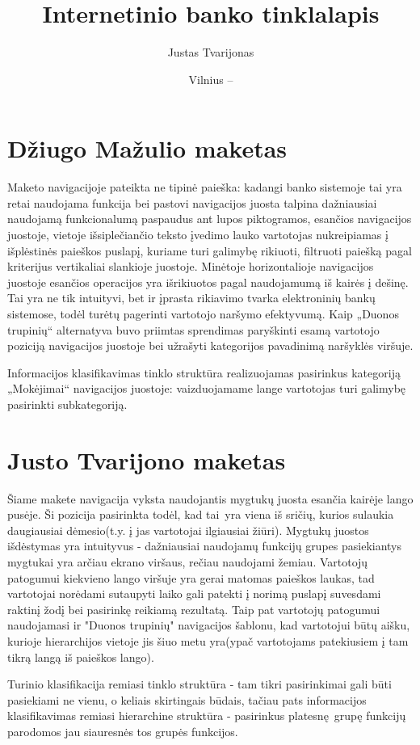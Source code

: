 \documentclass{VUMIFPSkursinis}
\title{Internetinio banko tinklalapis}
\author{Justas Tvarijonas}
\date{Vilnius – \the\year}
\begin{document}
\maketitle
\tableofcontents
\section{Džiugo Mažulio maketas}
Maketo navigacijoje pateikta ne tipinė paieška: kadangi banko sistemoje tai yra retai naudojama funkcija bei pastovi navigacijos juosta talpina dažniausiai naudojamą funkcionalumą paspaudus ant lupos piktogramos, esančios navigacijos juostoje, vietoje išsiplečiančio teksto įvedimo lauko vartotojas nukreipiamas į išplėstinės paieškos puslapį, kuriame turi galimybę rikiuoti, filtruoti paiešką pagal kriterijus vertikaliai slankioje juostoje. Minėtoje horizontalioje navigacijos juostoje esančios operacijos yra išrikiuotos pagal naudojamumą iš kairės į dešinę. Tai yra ne tik intuityvi, bet ir įprasta rikiavimo tvarka elektroninių bankų sistemose, todėl turėtų pagerinti vartotojo naršymo efektyvumą. Kaip „Duonos trupinių“ alternatyva buvo priimtas sprendimas paryškinti esamą vartotojo poziciją navigacijos juostoje bei užrašyti kategorijos pavadinimą naršyklės viršuje. \par Informacijos klasifikavimas tinklo struktūra realizuojamas pasirinkus kategoriją „Mokėjimai“ navigacijos juostoje: vaizduojamame lange vartotojas turi galimybę pasirinkti subkategoriją.

\section{Justo Tvarijono maketas}
Šiame makete navigacija vyksta naudojantis mygtukų juosta esančia kairėje lango pusėje. Ši pozicija pasirinkta todėl, kad tai yra viena iš sričių, kurios sulaukia daugiausiai dėmesio(t.y. į jas vartotojai ilgiausiai žiūri). Mygtukų juostos išdėstymas yra intuityvus - dažniausiai naudojamų funkcijų grupes pasiekiantys mygtukai yra arčiau ekrano viršaus, rečiau naudojami žemiau. Vartotojų patogumui kiekvieno lango viršuje yra gerai matomas paieškos laukas, tad vartotojai norėdami sutaupyti laiko gali patekti į norimą puslapį suvesdami raktinį žodį bei pasirinkę reikiamą rezultatą. Taip pat vartotojų patogumui naudojamasi ir "Duonos trupinių" navigacijos šablonu, kad vartotojui būtų aišku, kurioje hierarchijos vietoje jis šiuo metu yra(ypač vartotojams patekiusiem į tam tikrą langą iš paieškos lango). \par Turinio klasifikacija remiasi tinklo struktūra - tam tikri pasirinkimai gali būti pasiekiami ne vienu, o keliais skirtingais būdais, tačiau pats informacijos klasifikavimas remiasi hierarchine struktūra - pasirinkus platesnę grupę funkcijų parodomos jau siauresnės tos grupės funkcijos.
\end{document}
